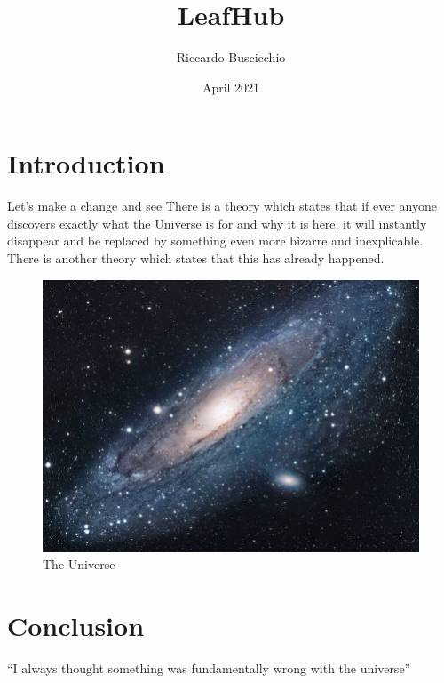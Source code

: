 \documentclass{article}
\title{LeafHub}
\author{Riccardo Buscicchio}
\date{April 2021}
\begin{document}
\maketitle

\section{Introduction}
Let's make a change and see
There is a theory which states that if ever anyone discovers exactly what the Universe is for and why it is here, it will instantly disappear and be replaced by something even more bizarre and inexplicable.
There is another theory which states that this has already happened.

\begin{figure}[h!]
\centering
\includegraphics[scale=1.7]{universe}
\caption{The Universe}
\label{fig:universe}
\end{figure}

\section{Conclusion}
``I always thought something was fundamentally wrong with the universe'' \citep{adams1995hitchhiker}



\end{document}
